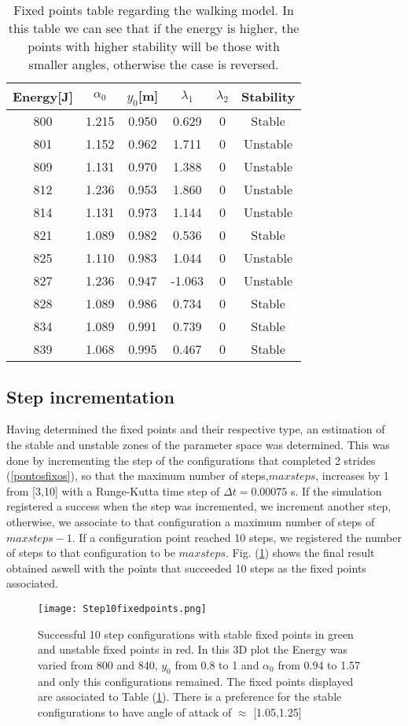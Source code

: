 \begin{table}[H]
 \centering
\begin{tabular}{c|c|c|c|c|c}
Energy{[}J{]} &  $\alpha_0$ & $y_0${[}m{]} & $\lambda_1$ & $\lambda_2$ & Stability \\ \hline
800 & 1.215 & 0.950 & 0.629 & 0 & Stable \\
801 & 1.152 & 0.962 & 1.711 & 0 & Unstable \\
809 & 1.131 & 0.970 & 1.388 & 0 & Unstable \\
812 & 1.236 & 0.953 & 1.860 & 0 & Unstable \\
814 & 1.131 & 0.973 & 1.144 & 0 & Unstable \\
821 & 1.089 & 0.982 & 0.536 & 0 & Stable \\
825 & 1.110 & 0.983 & 1.044 & 0 & Unstable \\
827 & 1.236 & 0.947 & -1.063 & 0 & Unstable \\
828 & 1.089 & 0.986 & 0.734 & 0 & Stable \\
834 & 1.089 & 0.991 & 0.739 & 0 & Stable \\
839 & 1.068 & 0.995 & 0.467 & 0 & Stable
\end{tabular}
\caption{Fixed points table regarding the walking model. In this table we can see that if the energy is higher, the points with higher stability will be those with smaller angles, otherwise the case is reversed.}
\label{tabela}
\end{table}

\subsection{Step incrementation}
Having determined the fixed points and their respective type, an estimation of the stable and unstable zones of the parameter space was determined. This was done by incrementing the step of the configurations that completed 2 strides (\ref{pontosfixos}), so that the maximum number of steps,$maxsteps$, increases by 1 from [3,10] with a Runge-Kutta time step of $\Delta t=0.00075$ s. If the simulation registered a success when the step was incremented, we increment another step, otherwise, we associate to that configuration a maximum number of steps of $maxsteps-1$. If a configuration point reached 10 steps, we registered the number of steps to that configuration to be $maxsteps$.
Fig. (\ref{step_10}) shows the final result obtained aswell with the points that succeeded 10 steps as the fixed points associated.
\begin{figure}[H]
  \centering
  \texttt{[image: Step10fixedpoints.png]}
  \caption{Successful 10 step configurations with stable fixed points in green and unstable fixed points in red. In this 3D plot the Energy was varied from 800 and 840, $y_0$ from 0.8 to 1 and $\alpha_0$ from 0.94 to 1.57 and only this configurations remained. The fixed points displayed are associated to Table (\ref{tabela}). There is a preference for the stable configurations to have angle of attack of $\approx$ [1.05,1.25]}
  \label{step_10}
  \end{figure}

